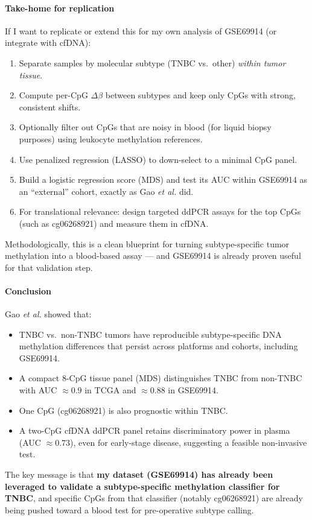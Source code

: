 \documentclass[10pt]{extarticle}
\begin{document}
\paragraph{Take-home for replication}
If I want to replicate or extend this for my own analysis of GSE69914 (or integrate with cfDNA):
\begin{enumerate}
    \item Separate samples by molecular subtype (TNBC vs.\ other) \emph{within tumor tissue}.
    \item Compute per-CpG \(\Delta \beta\) between subtypes and keep only CpGs with strong, consistent shifts.
    \item Optionally filter out CpGs that are noisy in blood (for liquid biopsy purposes) using leukocyte methylation references.
    \item Use penalized regression (LASSO) to down-select to a minimal CpG panel.
    \item Build a logistic regression score (MDS) and test its AUC within GSE69914 as an ``external'' cohort, exactly as Gao \textit{et al.} did.
    \item For translational relevance: design targeted ddPCR assays for the top CpGs (such as cg06268921) and measure them in cfDNA.
\end{enumerate}
Methodologically, this is a clean blueprint for turning subtype-specific tumor methylation into a blood-based assay --- and GSE69914 is already proven useful for that validation step. 

\paragraph{Conclusion}
Gao \textit{et al.} showed that:
\begin{itemize}[label=-]
    \item TNBC vs.\ non-TNBC tumors have reproducible subtype-specific DNA methylation differences that persist across platforms and cohorts, including GSE69914.
    \item A compact 8-CpG tissue panel (MDS) distinguishes TNBC from non-TNBC with AUC \(\approx 0.9\) in TCGA and \(\approx 0.88\) in GSE69914.
    \item One CpG (cg06268921) is also prognostic within TNBC.
    \item A two-CpG cfDNA ddPCR panel retains discriminatory power in plasma (AUC \(\approx 0.73\)), even for early-stage disease, suggesting a feasible non-invasive test.
\end{itemize}
The key message is that \textbf{my dataset (GSE69914) has already been leveraged to validate a subtype-specific methylation classifier for TNBC}, and specific CpGs from that classifier (notably cg06268921) are already being pushed toward a blood test for pre-operative subtype calling. 


\printbibliography
\end{document}
